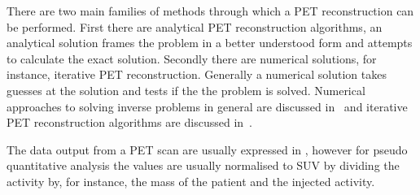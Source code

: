             There are two main families of methods through which a \gls{PET} reconstruction can be performed. First there are analytical \gls{PET} reconstruction algorithms, an analytical solution frames the problem in a better understood form and attempts to calculate the exact solution.%
            Secondly there are numerical solutions, for instance, iterative \gls{PET} reconstruction. Generally a numerical solution takes guesses at the solution and tests if the the problem is solved. Numerical approaches to solving inverse problems in general are discussed in~ and iterative \gls{PET} reconstruction algorithms are discussed in~.
            
            The data output from a \gls{PET} scan are usually expressed in , however for pseudo quantitative analysis the values are usually normalised to \gls{SUV} by dividing the activity by, for instance, the mass of the patient and the injected activity. %
        
                    
                    
            
